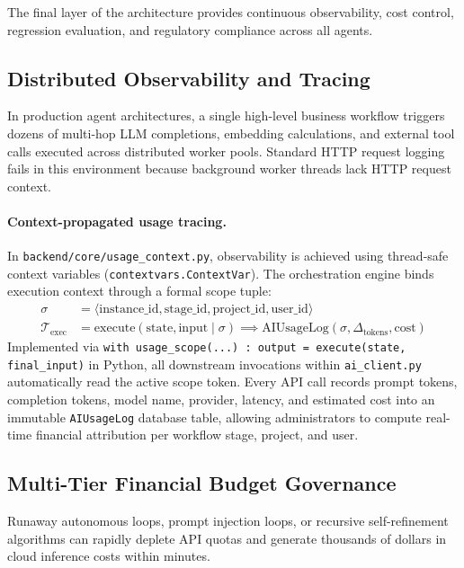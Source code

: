\documentclass[10pt,a4paper,twocolumn]{article}
\begin{document}
The final layer of the architecture provides continuous observability, cost control, regression evaluation, and regulatory compliance across all agents.

\subsection{Distributed Observability and Tracing}
In production agent architectures, a single high-level business workflow triggers dozens of multi-hop LLM completions, embedding calculations, and external tool calls executed across distributed worker pools. Standard HTTP request logging fails in this environment because background worker threads lack HTTP request context.

\paragraph{Context-propagated usage tracing.} In \texttt{backend/core/usage_context.py}, observability is achieved using thread-safe context variables (\texttt{contextvars.ContextVar}). The orchestration engine binds execution context through a formal scope tuple:
\begin{equation}
\label{eq:usage_scope}
\begin{split}
\sigma &= \langle \text{instance\_id}, \text{stage\_id}, \text{project\_id}, \text{user\_id} \rangle \\
\mathcal{T}_{\text{exec}} &= \text{execute}(\text{state}, \text{input} \mid \sigma) \implies \text{AIUsageLog}(\sigma, \Delta_{\text{tokens}}, \text{cost})
\end{split}
\end{equation}
Implemented via \texttt{with usage\_scope(...) : output = execute(state, final\_input)} in Python, all downstream invocations within \texttt{ai\_client.py} automatically read the active scope token. Every API call records prompt tokens, completion tokens, model name, provider, latency, and estimated cost into an immutable \texttt{AIUsageLog} database table, allowing administrators to compute real-time financial attribution per workflow stage, project, and user.

\subsection{Multi-Tier Financial Budget Governance}
Runaway autonomous loops, prompt injection loops, or recursive self-refinement algorithms can rapidly deplete API quotas and generate thousands of dollars in cloud inference costs within minutes.
\end{document}
